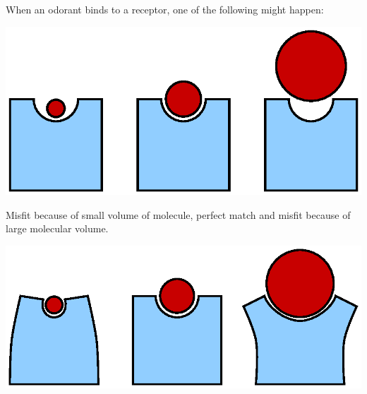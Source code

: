 \documentclass[a1paper,fontscale=0.5]{baposter} %
\begin{document}
\begin{poster}
{%
%
%

When an odorant binds to a receptor, one of the following might happen:
\begin{center}
\includegraphics[width=0.65 \textwidth]{fig/binding-pocket-size} \\
\end{center}
Misfit because of small volume of molecule, perfect match and misfit because of large molecular volume.

\begin{center}
\includegraphics[width=0.65 \textwidth]{fig/binding-pocket-flex}
\end{center}

}
\end{poster}
\end{document}

